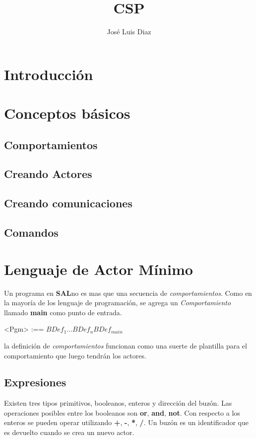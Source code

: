 \documentclass[fleqn]{article}
\title{CSP}
\author{José Luis Diaz}
\date{ }
\newcommand{\SAL}{\textbf{SAL}}
\begin{document}
 
\maketitle
 
\tableofcontents
 
\section{Introducción}

\section{Conceptos básicos}

\subsection*{Comportamientos}

\subsection*{Creando Actores}

\subsection*{Creando comunicaciones}

\subsection*{Comandos}

\section{Lenguaje de Actor Mínimo}

Un programa en \SAL no es mas que una secuencia de \textit{comportamientos}.
Como en la mayoría de los lenguaje de programación, se agrega un
\textit{Comportamiento} llamado \textbf{main} como punto de entrada.

\begin{grammar}
   <Pgm> :== $BDef_1 ... BDef_n BDef_{main} $ 
\end{grammar}

la definición de \textit{comportamientos} funcionan como una suerte de plantilla
para el comportamiento que luego tendrán los actores. 

\subsection{Expresiones}
Existen tres tipos primitivos, booleanos, enteros y dirección del buzón. Las operaciones
posibles entre los booleanos son \textbf{or}, \textbf{and}, \textbf{not}. Con
respecto a los enteros se pueden operar utilizando \textbf{+}, \textbf{-},
\textbf{*}, \textbf{/}. Un buzón es un identificador que es devuelto cuando se
crea un nuevo actor.
\end{document}
